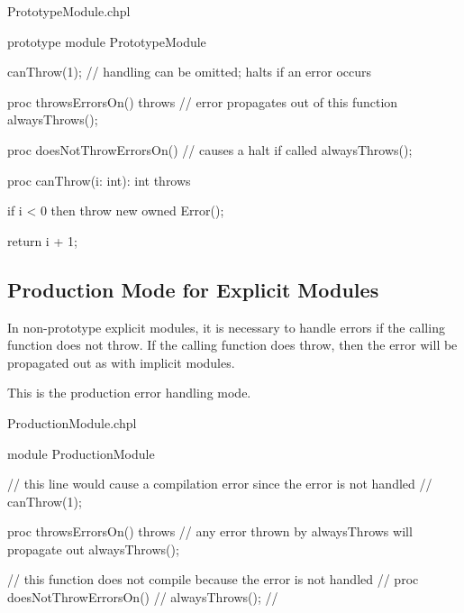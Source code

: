 \begin{chapelexample}{PrototypeModule.chpl}
\begin{chapel}
prototype module PrototypeModule {

  canThrow(1); // handling can be omitted; halts if an error occurs

  proc throwsErrorsOn() throws {
    // error propagates out of this function
    alwaysThrows();
  }

  proc doesNotThrowErrorsOn() {
    // causes a halt if called
    alwaysThrows();
  }

  proc canThrow(i: int): int throws {
    if i < 0 then
      throw new owned Error();

    return i + 1;
  }
}
\end{chapel}
\begin{chapelpost}
\end{chapelpost}
\begin{chapeloutput}
\end{chapeloutput}
\end{chapelexample}

\subsection{Production Mode for Explicit Modules}
\label{Production_Mode_for_Explicit_Modules}

In non-prototype explicit modules, it is necessary to handle errors if the
calling function does not throw. If the calling function does
throw, then the error will be propagated out as with implicit modules.

This is the production error handling mode.

\begin{chapelexample}{ProductionModule.chpl}
\begin{chapel}
module ProductionModule {
  // this line would cause a compilation error since the error is not handled
  // canThrow(1);

  proc throwsErrorsOn() throws {
    // any error thrown by alwaysThrows will propagate out
    alwaysThrows();
  }

  // this function does not compile because the error is not handled
  // proc doesNotThrowErrorsOn() {
  //   alwaysThrows();
  // }
}
\end{chapel}
\begin{chapelpost}
\end{chapelpost}
\begin{chapeloutput}
\end{chapeloutput}
\end{chapelexample}
